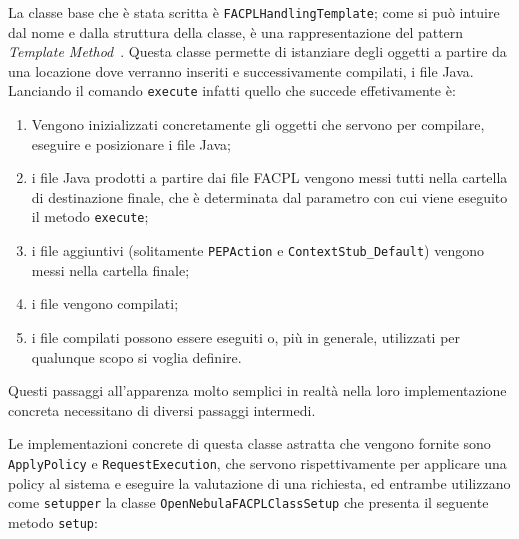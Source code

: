 La classe base che è stata scritta è \texttt{FACPLHandlingTemplate}; come si può intuire dal nome e dalla struttura della classe, è una rappresentazione del pattern \emph{Template Method}~\cite{GOF}. Questa classe permette di istanziare degli oggetti a partire da una locazione dove verranno inseriti e successivamente compilati, i file Java. Lanciando il comando \texttt{execute} infatti quello che succede effetivamente è:
\begin{enumerate}
    \item Vengono inizializzati concretamente gli oggetti che servono per compilare, eseguire e posizionare i file Java;
    \item i file Java prodotti a partire dai file FACPL vengono messi tutti nella cartella di destinazione finale, che è determinata dal parametro con cui viene eseguito il metodo \texttt{execute};
    \item i file aggiuntivi (solitamente \texttt{PEPAction} e \texttt{ContextStub\_Default}) vengono messi nella cartella finale;
    \item i file vengono compilati;
    \item i file compilati possono essere eseguiti o, più in generale, utilizzati per qualunque scopo si voglia definire.
\end{enumerate}
Questi passaggi all'apparenza molto semplici in realtà nella loro implementazione concreta necessitano di diversi passaggi intermedi.\par
Le implementazioni concrete di questa classe astratta che vengono fornite sono \texttt{ApplyPolicy} e \texttt{RequestExecution}, che servono rispettivamente per applicare una policy al sistema e eseguire la valutazione di una richiesta, ed entrambe utilizzano come \texttt{setupper} la classe \texttt{OpenNebulaFACPLClassSetup} che presenta il seguente metodo \texttt{setup}:
